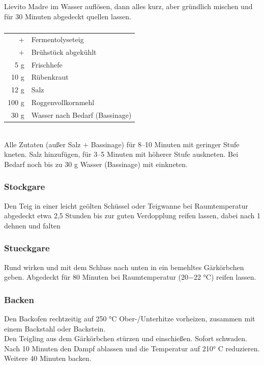 Lievito Madre im Wasser auflösen, dann alles kurz, aber gründlich mischen und für 30 Minuten abgedeckt quellen lassen.


\subsubsection*{}
\begin{tabular}{r l}
        + & Fermentolyseteig                     \\
        + & Brühstück abgekühlt                  \\
      5 g & Frischhefe                           \\
     10 g & Rübenkraut                           \\
     12 g & Salz                                 \\
    100 g & Roggenvollkornmehl                   \\
     30 g & Wasser nach Bedarf (\Gls{Bassinage})
\end{tabular}\\

Alle Zutaten (außer Salz + Bassinage) für 8–10 Minuten mit geringer Stufe kneten. Salz hinzufügen, für 3–5 Minuten mit höherer Stufe auskneten. Bei Bedarf noch bis zu 30 g Wasser (Bassinage) mit einkneten.


\subsubsection*{\Gls{Stockgare}}
Den Teig in einer leicht geölten Schüssel oder Teigwanne bei Raumtemperatur abgedeckt etwa 2,5 Stunden bis zur guten Verdopplung reifen lassen, dabei nach 1 dehnen und falten


\subsubsection*{\Gls{Stueckgare}}
Rund wirken und mit dem Schluss nach unten in ein bemehltes Gärkörbchen geben. Abgedeckt für 80 Minuten bei Raumtemperatur (20−22 °C) reifen lassen. 

\subsubsection*{\Gls{Backen}}
Den Backofen rechtzeitig auf 250 °C Ober-/Unterhitze  vorheizen, zusammen mit einem Backstahl oder Backstein.\\
Den Teigling aus dem Gärkörbchen stürzen und einschießen. Sofort schwaden. \\
Nach 10 Minuten den Dampf ablassen und die Temperatur auf 210° C reduzieren. Weitere 40 Minuten backen.

